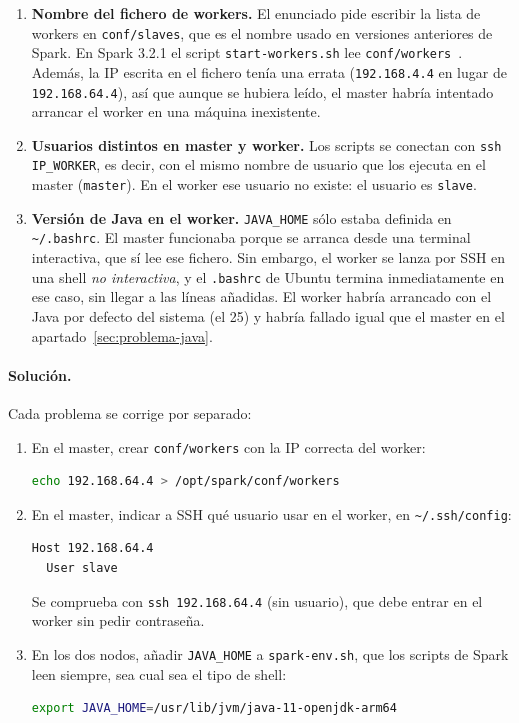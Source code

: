 \documentclass[11pt,a4paper]{article}
\begin{document}
\begin{enumerate}
  \item \textbf{Nombre del fichero de workers.} El enunciado pide escribir la lista de workers en \texttt{conf/slaves}, que es el nombre usado en versiones anteriores de Spark. En Spark 3.2.1 el script \texttt{start-workers.sh} lee \texttt{conf/workers}~\cite{spark-standalone}. Además, la IP escrita en el fichero tenía una errata (\texttt{192.168.4.4} en lugar de \texttt{192.168.64.4}), así que aunque se hubiera leído, el master habría intentado arrancar el worker en una máquina inexistente.

  \item \textbf{Usuarios distintos en master y worker.} Los scripts se conectan con \texttt{ssh IP\_WORKER}, es decir, con el mismo nombre de usuario que los ejecuta en el master (\texttt{master}). En el worker ese usuario no existe: el usuario es \texttt{slave}.

  \item \textbf{Versión de Java en el worker.} \texttt{JAVA\_HOME} sólo estaba definida en \texttt{\textasciitilde/.bashrc}. El master funcionaba porque se arranca desde una terminal interactiva, que sí lee ese fichero. Sin embargo, el worker se lanza por SSH en una shell \emph{no interactiva}, y el \texttt{.bashrc} de Ubuntu termina inmediatamente en ese caso, sin llegar a las líneas añadidas. El worker habría arrancado con el Java por defecto del sistema (el 25) y habría fallado igual que el master en el apartado~\ref{sec:problema-java}.
\end{enumerate}

\paragraph{Solución.} Cada problema se corrige por separado:
\begin{enumerate}
  \item En el master, crear \texttt{conf/workers} con la IP correcta del worker:
\begin{lstlisting}[language=bash]
echo 192.168.64.4 > /opt/spark/conf/workers
\end{lstlisting}
  \item En el master, indicar a SSH qué usuario usar en el worker, en \texttt{\textasciitilde/.ssh/config}:
\begin{lstlisting}
Host 192.168.64.4
  User slave
\end{lstlisting}
  Se comprueba con \texttt{ssh 192.168.64.4} (sin usuario), que debe entrar en el worker sin pedir contraseña.
  \item En los dos nodos, añadir \texttt{JAVA\_HOME} a \texttt{spark-env.sh}, que los scripts de Spark leen siempre, sea cual sea el tipo de shell:
\begin{lstlisting}[language=bash]
export JAVA_HOME=/usr/lib/jvm/java-11-openjdk-arm64
\end{lstlisting}
\end{enumerate}
\end{document}
